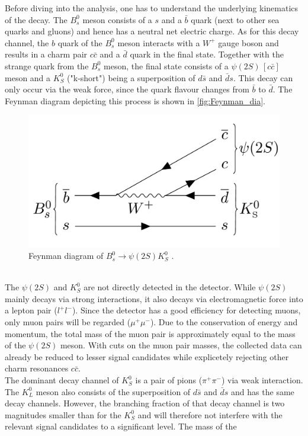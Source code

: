 Before diving into the analysis, one has to understand the underlying kinematics of the decay. The $B_s^0$ meson consists of a $s$ and a $\bar{b}$ quark (next to other sea quarks and gluons) and hence
has a neutral net electric charge. As for this decay channel, the $b$ quark of the $B_s^0$ meson interacts with a $W^+$ gauge boson and results in a charm pair $c \bar{c}$ and a $\bar{d}$ quark in the 
final state. Together with the strange quark from the $B_s^0$ meson, the final state consists of a $\psi (2S) \, [c \bar{c}]$ meson and a $K_S^0$ ("k-short") being a superposition of $d\bar{s}$ and $\bar{d}s$.
This decay can only occur via the weak force, since the quark flavour changes from $\bar{b}$ to $\bar{d}$. The Feynman diagram depicting this process is shown in \autoref{fig:Feynman_dia}.
\begin{figure}
    \centering
    \includegraphics[width = .7\textwidth]{"content/pics/Feynman.png"}
    \caption{Feynman diagram of $B_s^0 \to \psi (2S)K_S^0$ \cite{LHCb_MVA}.}
    \label{fig:Feynman_dia}
  \end{figure}
\\The $\psi (2S)$ and $K_S^0$ are not directly detected in the detector. While $\psi (2S)$ mainly decays via strong interactions, it also decays via
electromagnetic force into a lepton pair ($l^+l^-$).
Since the detector has a good efficiency for detecting muons, only muon pairs will be regarded ($\mu^+\mu^-$). Due to the conservation of energy and momentum, the 
total mass of the muon pair is approximately equal to the mass of the $\psi (2S)$ meson. With cuts on the muon pair masses, the collected data can already be reduced to lesser signal candidates while explicetely
rejecting other charm resonances $c\bar{c}$.\\
The dominant decay channel of $K_S^0$ is a pair of pions ($\pi^+\pi^-$) via weak interaction. The $K_L^0$ meson also consists of the superposition of $d\bar{s}$ and $\bar{d}s$ and has the same decay channels.
However, the branching fraction of that decay channel is two magnitudes smaller than for the $K_S^0$ and will therefore not interfere with the relevant signal candidates to a significant level. The mass of the
